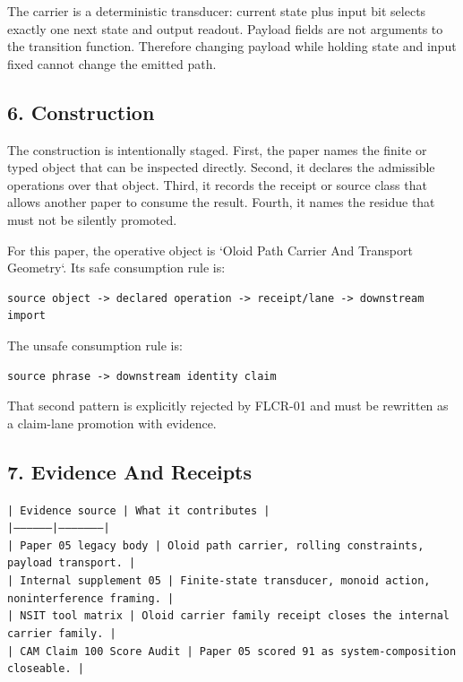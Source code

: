 \documentclass[11pt]{article}
\begin{document}
The carrier is a deterministic transducer: current state plus input bit selects exactly one next state and output readout. Payload fields are not arguments to the transition function. Therefore changing payload while holding state and input fixed cannot change the emitted path.

\subsection*{6. Construction}

The construction is intentionally staged. First, the paper names the finite or
typed object that can be inspected directly. Second, it declares the admissible
operations over that object. Third, it records the receipt or source class that
allows another paper to consume the result. Fourth, it names the residue that
must not be silently promoted.

For this paper, the operative object is `Oloid Path Carrier And Transport Geometry`. Its safe consumption
rule is:

\begin{verbatim}
source object -> declared operation -> receipt/lane -> downstream import
\end{verbatim}

The unsafe consumption rule is:

\begin{verbatim}
source phrase -> downstream identity claim
\end{verbatim}

That second pattern is explicitly rejected by FLCR-01 and must be rewritten as
a claim-lane promotion with evidence.

\subsection*{7. Evidence And Receipts}

\noindent\texttt{| Evidence source | What it contributes |}\\
\noindent\texttt{|-----------------|---------------------|}\\
\noindent\texttt{| Paper 05 legacy body | Oloid path carrier, rolling constraints, payload transport. |}\\
\noindent\texttt{| Internal supplement 05 | Finite-state transducer, monoid action, noninterference framing. |}\\
\noindent\texttt{| NSIT tool matrix | Oloid carrier family receipt closes the internal carrier family. |}\\
\noindent\texttt{| CAM Claim 100 Score Audit | Paper 05 scored 91 as system-composition closeable. |}\\
\end{document}
